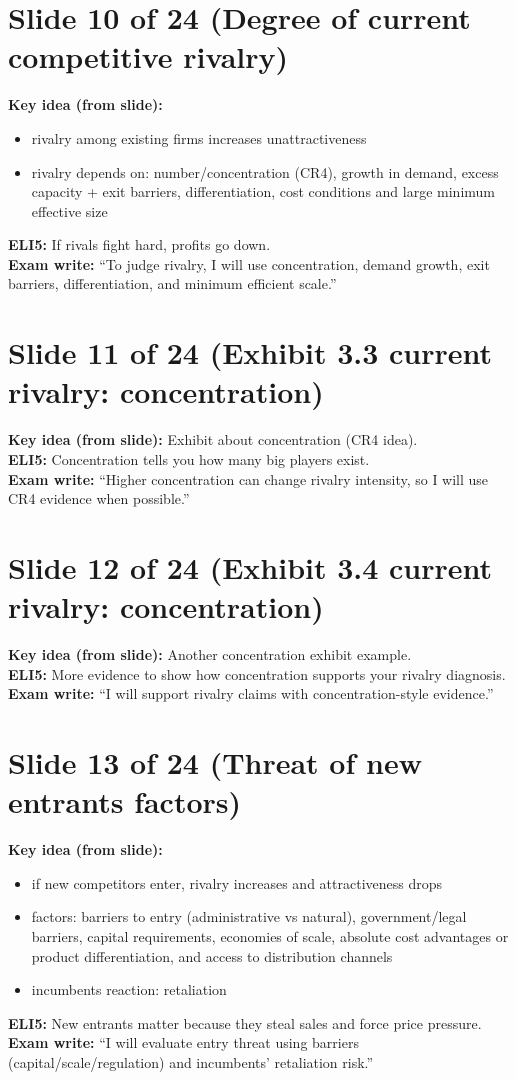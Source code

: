 \documentclass[11pt,a4paper]{article}
\begin{document}
\section*{Slide 10 of 24 (Degree of current competitive rivalry)}
\textbf{Key idea (from slide):}
\begin{itemize}
  \item rivalry among existing firms increases unattractiveness
  \item rivalry depends on: number/concentration (CR4), growth in demand, excess capacity + exit barriers, differentiation, cost conditions and large minimum effective size
 \end{itemize}
\textbf{ELI5:} If rivals fight hard, profits go down.\\
\textbf{Exam write:} ``To judge rivalry, I will use concentration, demand growth, exit barriers, differentiation, and minimum efficient scale.''

\section*{Slide 11 of 24 (Exhibit 3.3 current rivalry: concentration)}
\textbf{Key idea (from slide):} Exhibit about concentration (CR4 idea).\\
\textbf{ELI5:} Concentration tells you how many big players exist.\\
\textbf{Exam write:} ``Higher concentration can change rivalry intensity, so I will use CR4 evidence when possible.''

\section*{Slide 12 of 24 (Exhibit 3.4 current rivalry: concentration)}
\textbf{Key idea (from slide):} Another concentration exhibit example.\\
\textbf{ELI5:} More evidence to show how concentration supports your rivalry diagnosis.\\
\textbf{Exam write:} ``I will support rivalry claims with concentration-style evidence.''

\section*{Slide 13 of 24 (Threat of new entrants factors)}
\textbf{Key idea (from slide):}
\begin{itemize}
  \item if new competitors enter, rivalry increases and attractiveness drops
  \item factors: barriers to entry (administrative vs natural), government/legal barriers, capital requirements, economies of scale, absolute cost advantages or product differentiation, and access to distribution channels
  \item incumbents reaction: retaliation
\end{itemize}
\textbf{ELI5:} New entrants matter because they steal sales and force price pressure.\\
\textbf{Exam write:} ``I will evaluate entry threat using barriers (capital/scale/regulation) and incumbents' retaliation risk.''
\end{document}
